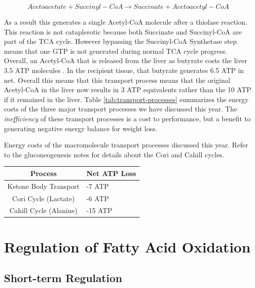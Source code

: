\documentclass{tufte-handout}
\begin{document}
\begin{equation}\label{eq:oxct1}
Acetoacetate + Succinyl-CoA \rightarrow Succinate + Acetoacetyl-CoA
\end{equation} 

As a result this generates a single Acetyl-CoA molecule after a thiolase reaction.  This reaction is not cataplerotic because both Succinate and Succinyl-CoA are part of the TCA cycle.  However bypassing the Succinyl-CoA Synthetase step means that one GTP is not generated during normal TCA cycle progress.  Overall, an Acetyl-CoA that is released from the liver as butyrate costs the liver 3.5 ATP molecules .  In the recipient tissue, that butyrate generates 6.5 ATP in net.  Overall this means that this transport process means that the original Acetyl-CoA in the liver now results in 3 ATP equivalents rather than the 10 ATP if it remained in the liver.  Table \ref{tab:transport-processes} summarizes the energy costs of the three major transport processes we have discussed this year.  The \emph{inefficiency} of these transport processes is a cost to performance, but a benefit to generating negative energy balance for weight loss.

\begin{margintable}
\centering
\caption{Energy costs of the macromolecule transport processes discussed this year.  Refer to the gluconeogenesis notes for details about the Cori and Cahill cycles.}
\label{tab:transport-processes}
\begin{tabular}{@{}cl@{}}
\toprule
\textbf{Process} & \textbf{Net ATP Loss} \\ \midrule
Ketone Body Transport  &  -7 ATP  \\
Cori Cycle (Lactate)    & -6 ATP  \\
Cahill Cycle (Alanine)       & -15 ATP \\ \bottomrule
\end{tabular}
\end{margintable}

\section{Regulation of Fatty Acid Oxidation}

\subsection{Short-term Regulation}
\end{document}
